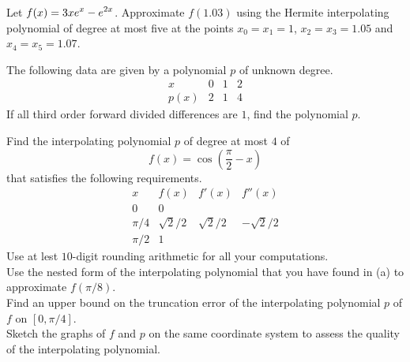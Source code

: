 \begin{question}
Let $\displaystyle f(x) = 3x e^x - e^{2x}$.  Approximate $f(1.03)$
using the Hermite interpolating polynomial of degree at most five at the points
$x_0 = x_1 = 1$, $x_2 = x_3 = 1.05$ and $x_4 = x_5 = 1.07$.
\end{question}

\begin{question}
The following data are given by a polynomial $p$ of unknown degree.
\[
\begin{array}{c|c|c|c}
 x & 0 & 1 & 2 \\
\hline
 p(x) & 2 & 1 & 4
\end{array}
\]
If all third order forward divided differences are $1$, find the
polynomial $p$.
\end{question}


\begin{question}
 Find the interpolating polynomial $p$ of degree at most $4$ of
\[
f(x) = \cos\left(\frac{\pi}{2}-x\right)
\]
that satisfies the following requirements.
\[
\begin{array}{c|c|c|c}
x & f(x) & f'(x) & f''(x) \\
\hline
0 & 0 & & \\
\pi/4 & \sqrt{2}/2 & \sqrt{2}/2 & - \sqrt{2}/2 \\
\pi/2 & 1 &  & 
\end{array}
\]
Use at lest $10$-digit rounding arithmetic for all your computations.\\
 Use the nested form of the interpolating polynomial that you
have found in (a) to approximate $f(\pi/8)$.\\
 Find an upper bound on the truncation error of the
interpolating polynomial $p$ of $f$ on $[0,\pi/4]$.\\
 Sketch the graphs of $f$ and $p$ on the same coordinate
system to assess the quality of the interpolating polynomial.
\end{question}

